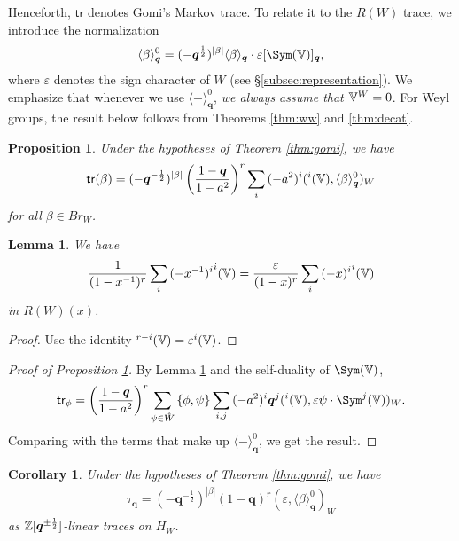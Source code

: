 \documentclass[a4paper,10pt,leqno]{amsart}
\theoremstyle{plain}
\theoremstyle{plain}
\theoremstyle{plain}
\newtheorem{cor}[thm]{Corollary}
\newtheorem{lem}[thm]{Lemma}
\newtheorem{prop}[thm]{Proposition}
\theoremstyle{definition}
\theoremstyle{remark}
\let\Alt\relax
\DeclareMathOperator{\Alt}{\text{$\Lambda$}}
\newcommand{\Br}{\mathit{Br}}
\newcommand{\Q}{\bm{q}}
\newcommand{\Tr}[1]{\langle{#1}\rangle_{\Q}}
\begin{document}
Henceforth, $\mathsf{tr}$ denotes Gomi's Markov trace.
To relate it to the $R(W)$ trace, we introduce the normalization
\begin{align}
\Tr{\beta}^0 = {(-\Q^{\frac{1}{2}})^{|\beta|}} \Tr{\beta} \cdot \varepsilon [\Sym(\bb{V})]_{\Q},
\end{align}
where $\varepsilon$ denotes the sign character of $W$ (see \S\ref{subsec:representation}).
We emphasize that whenever we use $\Tr{-}^0$, \emph{we always assume that $\mathbb{V}^W = 0$}.
For Weyl groups, the result below follows from Theorems \ref{thm:ww} and \ref{thm:decat}.

\begin{prop}\label{prop:markov}
Under the hypotheses of Theorem \ref{thm:gomi}, we have
\begin{align}
\mathsf{tr}(\beta)
=	(-\Q^{-\frac{1}{2}})^{|\beta|}
	\pa{\frac{1 - \Q}{1 - a^2}}^r
	\sum_i
	{(-a^2)^i}
	(\Alt^i(\bb{V}), \Tr{\beta}^0)_W
\end{align}
for all $\beta \in \Br_W$.
\end{prop}

\begin{lem}\label{lem:self-dual}
We have
\begin{align}
\frac{1}{(1 - x^{-1})^r}
\sum_i {(-x^{-1})^i} \Alt^i(\bb{V})
=	
\frac{\varepsilon}{(1 - x)^r}
\sum_i {(-x)^i} \Alt^i(\bb{V})
\end{align}
in $R(W)(x)$.
\end{lem}

\begin{proof}
Use the identity $\Alt^{r - i}(\bb{V}) = \varepsilon \Alt^i(\bb{V})$.
\end{proof}

\begin{proof}[Proof of Proposition \ref{prop:markov}]
By Lemma \ref{lem:self-dual} and the self-duality of $\Sym(\bb{V})$,
\begin{align}
\mathsf{tr}_\phi
=	\pa{\frac{1 - \Q}{1 - a^2}}^r 
\sum_{\psi \in \hat{W}}
{\{\phi, \psi\}}
\sum_{i, j} {(-a^2)^i} \Q^j
(\Alt^i(\bb{V}), \varepsilon \psi \cdot \Sym^j(\bb{V}))_W.
\end{align}
Comparing with the terms that make up $\Tr{-}^0$, we get the result.
\end{proof}

\begin{cor}
Under the hypotheses of Theorem \ref{thm:gomi}, we have
\begin{align}
\tau_{\Q} = (-\Q^{-\frac{1}{2}})^{|\beta|} (1 - \Q)^r (\varepsilon, \Tr{\beta}^0)_W
\end{align}
as $\bb{Z}[\Q^{\pm \frac{1}{2}}]$-linear traces on $H_W$.
\end{cor}
\end{document}
